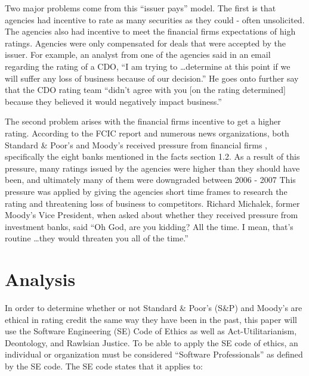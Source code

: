 \documentclass[11pt]{article}
\begin{document}
\begin{multicols}{2}
Two major problems come from this ``issuer pays'' model.  The first is that agencies had incentive to rate as many securities as they could - often unsolicited. \cite[p.60]{gatekeepers} The agencies also had incentive to meet the financial firms expectations of high ratings.  Agencies were only compensated for deals that were accepted by the issuer. \cite[p.210]{govtReport} For example, an analyst from one of the agencies said in an email regarding the rating of a CDO, ``I am trying to \ldots determine at this point if we will suffer any loss of business because of our decision.'' He goes onto further say that the CDO rating team ``didn't agree with you [on the rating determined] because they believed it would negatively impact business.'' \cite[p. 26]{SEA} 

The second problem arises with the financial firms incentive to get a higher rating.  According to the FCIC report and numerous news organizations, both Standard \& Poor's and Moody's received pressure from financial firms \cite[p.xxv]{govtReport}, specifically the eight banks mentioned in the facts section 1.2.  As a result of this pressure, many ratings issued by the agencies were higher than they should have been, and ultimately many of them were downgraded between 2006 - 2007 \cite{ratingEthics, huffCreditCause}  This pressure was applied by giving the agencies short time frames to research the rating and threatening loss of business to competitors. \cite[p.210]{govtReport}  Richard Michalek, former Moody's Vice President, when asked about whether they received pressure from investment banks, said ``Oh God, are you kidding? All the time. I mean, that's routine \ldots they would threaten you all of the time.'' \cite[p.210]{govtReport}



\section{Analysis}
In order to determine whether or not Standard \& Poor's (S\&P) and Moody's are ethical in rating credit the same way they have been in the past, this paper will use the Software Engineering (SE) Code of Ethics as well as Act-Utilitarianism, Deontology, and Rawlsian Justice.  To be able to apply the SE code of ethics, an individual or organization must be considered ``Software Professionals'' as defined by the SE code. The SE code states that it applies to:


\end{multicols}
\end{document}
